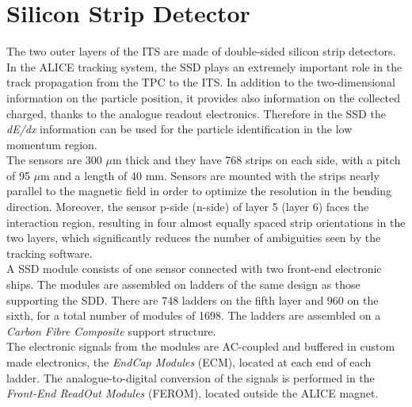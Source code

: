 \section{Silicon Strip Detector}
The two outer layers of the ITS are made of double-sided silicon strip detectors. In the ALICE tracking system, the SSD plays an extremely important role in the track propagation from the TPC to the ITS. In addition to the two-dimensional information on the particle position, it provides also information on the collected charged, thanks to the analogue readout electronics. Therefore in the SSD the \textit{dE/dx} information can be used for the particle identification in the low momentum region.\\
The sensors are 300 $\mu$m thick and they have 768 strips on each side, with a pitch of 95 $\mu$m and a length of 40 mm. Sensors are mounted with the strips nearly parallel to the magnetic field in order to optimize the resolution in the bending direction. Moreover, the sensor p-side (n-side) of layer 5 (layer 6) faces the interaction region, resulting in four almost equally spaced strip orientations in the two layers, which significantly reduces the number of ambiguities seen by the tracking software.\\
A SSD module consists of one sensor connected with two front-end electronic ships. The modules are assembled on ladders of the same design as those supporting the SDD. There are 748 ladders on the fifth layer and 960 on the sixth, for a total number of modules of 1698. The ladders are assembled on a \textit{Carbon Fibre Composite} support structure.\\
The electronic signals from the modules are AC-coupled and buffered in custom made electronics, the \textit{EndCap Modules} (ECM), located at each end of each ladder. The analogue-to-digital conversion of the signals is performed in the \textit{Front-End ReadOut Modules} (FEROM), located outside the ALICE magnet.